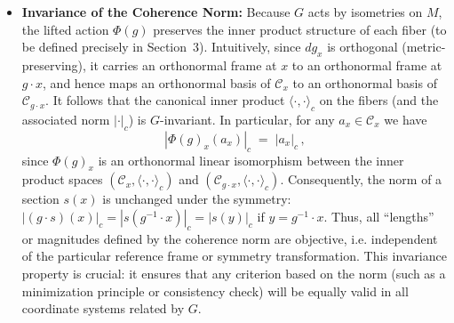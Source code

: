 \documentclass[12pt]{article}
\begin{document}
\begin{itemize}
    \item \textbf{Invariance of the Coherence Norm:} Because $G$ acts by isometries on $M$, the lifted action $\Phi(g)$ preserves the inner product structure of each fiber (to be defined precisely in Section~3). Intuitively, since $dg_x$ is orthogonal (metric-preserving), it carries an orthonormal frame at $x$ to an orthonormal frame at $g\cdot x$, and hence maps an orthonormal basis of $\mathcal{C}_x$ to an orthonormal basis of $\mathcal{C}_{g\cdot x}$. It follows that the canonical inner product $\langle\cdot,\cdot\rangle_c$ on the fibers (and the associated norm $|\cdot|_c$) is $G$-invariant. In particular, for any $a_x \in \mathcal{C}_x$ we have 
    \[
       |\Phi(g)_x(a_x)|_c \;=\; |a_x|_c\,,
    \] 
    since $\Phi(g)_x$ is an orthonormal linear isomorphism between the inner product spaces $(\mathcal{C}_x,\langle\cdot,\cdot\rangle_c)$ and $(\mathcal{C}_{g\cdot x},\langle\cdot,\cdot\rangle_c)$. Consequently, the norm of a section $s(x)$ is unchanged under the symmetry: $| (g\cdot s)(x) |_c = |s(g^{-1}\cdot x)|_c = |s(y)|_c$ if $y = g^{-1}\cdot x$. Thus, all “lengths” or magnitudes defined by the coherence norm are objective, i.e. independent of the particular reference frame or symmetry transformation. This invariance property is crucial: it ensures that any criterion based on the norm (such as a minimization principle or consistency check) will be equally valid in all coordinate systems related by $G$.
\end{itemize}
\end{document}

